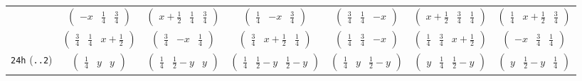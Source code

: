 \documentclass[fleqn,9pt,landscape]{jsarticle}
\begin{document}
\begin{center}
\begin{longtable}{ccccccc}
& $ \begin{pmatrix} - x & \frac{1}{4} & \frac{3}{4} \end{pmatrix} $ & $ \begin{pmatrix} x + \frac{1}{2} & \frac{1}{4} & \frac{3}{4} \end{pmatrix} $ & $ \begin{pmatrix} \frac{1}{4} & - x & \frac{3}{4} \end{pmatrix} $ & $ \begin{pmatrix} \frac{3}{4} & \frac{1}{4} & - x \end{pmatrix} $ & $ \begin{pmatrix} x + \frac{1}{2} & \frac{3}{4} & \frac{1}{4} \end{pmatrix} $ & $ \begin{pmatrix} \frac{1}{4} & x + \frac{1}{2} & \frac{3}{4} \end{pmatrix} $ \\
& $ \begin{pmatrix} \frac{3}{4} & \frac{1}{4} & x + \frac{1}{2} \end{pmatrix} $ & $ \begin{pmatrix} \frac{3}{4} & - x & \frac{1}{4} \end{pmatrix} $ & $ \begin{pmatrix} \frac{3}{4} & x + \frac{1}{2} & \frac{1}{4} \end{pmatrix} $ & $ \begin{pmatrix} \frac{1}{4} & \frac{3}{4} & - x \end{pmatrix} $ & $ \begin{pmatrix} \frac{1}{4} & \frac{3}{4} & x + \frac{1}{2} \end{pmatrix} $ & $ \begin{pmatrix} - x & \frac{3}{4} & \frac{1}{4} \end{pmatrix} $ \\ \hline
{\tt 24h} ({\tt ..2}) & $ \begin{pmatrix} \frac{1}{4} & y & y \end{pmatrix} $ & $ \begin{pmatrix} \frac{1}{4} & \frac{1}{2} - y & y \end{pmatrix} $ & $ \begin{pmatrix} \frac{1}{4} & \frac{1}{2} - y & \frac{1}{2} - y \end{pmatrix} $ & $ \begin{pmatrix} \frac{1}{4} & y & \frac{1}{2} - y \end{pmatrix} $ & $ \begin{pmatrix} y & \frac{1}{4} & \frac{1}{2} - y \end{pmatrix} $ & $ \begin{pmatrix} y & \frac{1}{2} - y & \frac{1}{4} \end{pmatrix} $ \\

\end{longtable}
\end{center}
\end{document}
